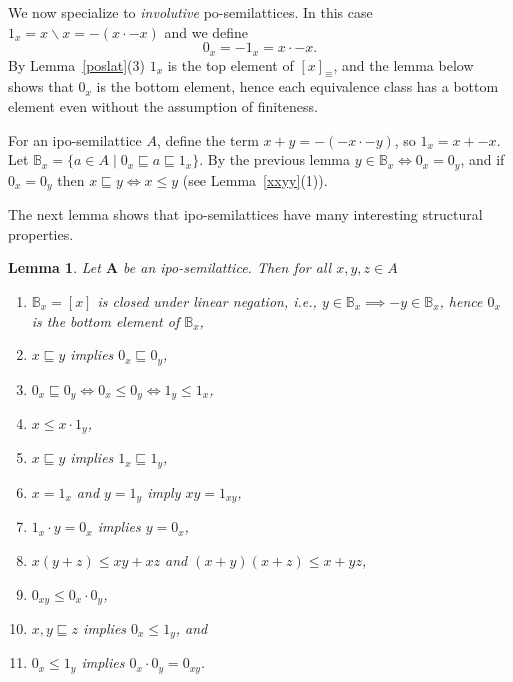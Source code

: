 \documentclass[12pt]{amsart}
\newtheorem{lemma}[theorem]{Lemma}
\newcommand{\m}{\mathbf} %
\newcommand{\ld}{{\backslash}}
\begin{document}
We now specialize to \emph{involutive} po-semilattices. In this case $1_x=x\ld x=-(x\cdot -x)$
and we define $$0_x=-1_x=x\cdot -x.$$
By Lemma~\ref{poslat}(3) $1_x$
is the top element of $[x]_\equiv$, and the lemma below shows that $0_x$ is the bottom element,
hence each equivalence class has a bottom element even without the assumption of finiteness.

For an ipo-semilattice $A$, define the term $x+y=-(-x\cdot-y)$, so
$1_x=x+-x$. Let $\mathbb B_x=\{a\in A\mid 0_x\sqsubseteq a\sqsubseteq 1_x\}$.
By the previous lemma $y\in \mathbb B_x\iff 0_x=0_y$, and if $0_x=0_y$ then $x\sqsubseteq y\iff x\le y$ (see Lemma~\ref{xxyy}(1)).

The next lemma shows that ipo-semilattices have many interesting structural properties.

\begin{lemma} \label{props} Let $\m A$ be an ipo-semilattice. Then for all $x,y,z\in A$
\begin{enumerate}
\item $\mathbb B_x=[x]$ is closed under linear negation, i.e.,  $y\in \mathbb B_x\implies -y\in \mathbb B_x$, hence $0_x$ is the bottom element of $\mathbb B_x$,
\item $x\sqsubseteq y$ implies $0_x\sqsubseteq 0_y$,
\item $0_x\sqsubseteq 0_y \iff 0_x\le 0_y \iff 1_y\le 1_x$,
\item $x\le x\cdot 1_y$,
\item $x\sqsubseteq y$ implies $1_x\sqsubseteq 1_y$,
\item $x=1_x$ and $y=1_y$ imply $xy=1_{xy}$,
\item $1_x\cdot y=0_x$ implies $y=0_x$,
\item $x(y+z)\le xy+xz$ and $(x+y)(x+z)\le x+yz$,
\item $0_{xy}\le 0_x\cdot 0_y$,
\item $x,y\sqsubseteq z$ implies $0_x\le 1_y$, and
\item $0_x\le 1_y$ implies $0_x\cdot 0_y=0_{xy}$.
\end{enumerate}
\end{lemma}
\end{document}
